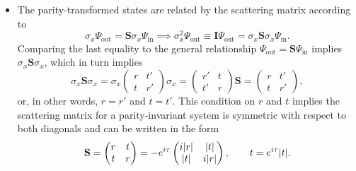 \documentclass[11pt, a4paper]{article}
\newcommand{\mat}[1]{\mathbf{#1}}  %
\renewcommand{\SS}{\mat{S}}  %
\begin{document}
\begin{itemize}
    \item The parity-transformed states are related by the scattering matrix according to
    \begin{equation*}
        \sigma_{x} \Psi_{\text{out}} = \SS \sigma_{x} \Psi_{\text{in}} \implies \sigma_{x}^{2} \Psi_{\text{out}} \equiv \mat{I} \Psi_{\text{out}} = \sigma_{x}\SS \sigma_{x} \Psi_{\text{in}}.
    \end{equation*}
    Comparing the last equality to the general relationship $ \Psi_{\text{out}} = \SS \Psi_{\text{in}} $ implies $ \sigma_{x} \SS \sigma_{x} $, which in turn implies
    \begin{equation*}
        \sigma_{x} \SS \sigma_{x} = \sigma_{x}
        \begin{pmatrix}
            r & t'\\
            t & r'
        \end{pmatrix}
        \sigma_{x} = 
        \begin{pmatrix}
            r' & t\\
            t' & r
        \end{pmatrix}
        \SS = 
        \begin{pmatrix}
            r & t'\\
            t & r'
        \end{pmatrix},
    \end{equation*}
    or, in other words, $ r = r' $ and $ t = t' $. This condition on $ r $ and $ t $ implies the scattering matrix for a parity-invariant system is symmetric with respect to both diagonals and can be written in the form
    \begin{equation*}
        \SS = 
        \begin{pmatrix}
            r & t\\
            t & r
        \end{pmatrix} 
        = - e^{i\tau}
        \begin{pmatrix}
            i \abs{r} & \abs{t}\\
            \abs{t} & i \abs{r}
        \end{pmatrix}, 
        \qquad t = e^{i\tau}\abs{t}.
    \end{equation*}
    
    
\end{itemize}
\end{document}
